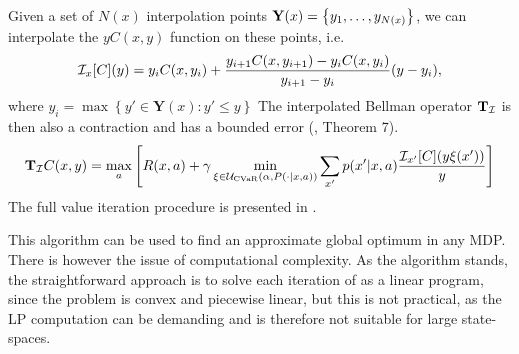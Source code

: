 Given a set of $N(x)$ interpolation points $\mathbf{Y}(x) = \left\{ {y_1, \dots, y_{N(x)}} \right\}$, we can interpolate the $yC(x,y)$ function on these points, i.e.
%
\begin{equation*}
\mathcal{I}_{x}[C](y)=y_iC(x,y_{i})+\frac{y_{i+1}C(x,y_{i+1})-y_iC(x,y_{i})}{y_{i+1}-y_i}(y-y_i),
\end{equation*}
%
where $y_i = \max \left\{y'\in \mathbf{Y}(x) : y' \leq y\right\}$
The interpolated Bellman operator $\mathbf{T}_{\mathcal{I}}$ is then also a contraction and has a bounded error (\citep{chow2015risk}, Theorem 7). 
%
\begin{equation}\label{eqn:linearbellman}
\mathbf{T}_{\mathcal{I}} C(x, y) = \max_a \left[ { R(x, a) + \gamma \min_{\xi \in \mathcal{U}_{\text{CVaR}}(\alpha, P(\cdot | x, a))} \sum_{x'} p(x'| x, a)\dfrac{\mathcal{I}_{x'} [C](y\xi(x'))}{y}} \right]
\end{equation}
%
The full value iteration procedure is presented in . 

This algorithm can be used to find an approximate global optimum in any MDP. There is however the issue of computational complexity. As the algorithm stands, the straightforward approach is to solve each iteration of  as a linear program, since the problem is convex and piecewise linear, but this is not practical, as the LP computation can be demanding and is therefore not suitable for large state-spaces.


